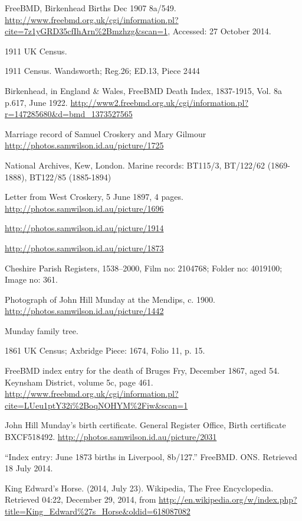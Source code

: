\begin{thebibliography}{99}
	FreeBMD, Birkenhead Births Dec 1907 8a/549.
	\url{http://www.freebmd.org.uk/cgi/information.pl?cite=7z1yGRD35cfIhArn\%2Bmzhzg&scan=1}, Accessed: 27 October 2014.

	1911 UK Census.

	1911 Census. Wandsworth; Reg.26; ED.13, Piece 2444

	Birkenhead, in England \& Wales, FreeBMD Death Index, 1837-1915, Vol. 8a p.617, June 1922.
	\url{http://www2.freebmd.org.uk/cgi/information.pl?r=147285680&d=bmd_1373527565}

	Marriage record of Samuel Croskery and Mary Gilmour
	\url{http://photos.samwilson.id.au/picture/1725}

	National Archives, Kew, London.
	Marine records: BT115/3, BT/122/62 (1869-1888), BT122/85 (1885-1894)

	Letter from West Croskery, 5 June 1897, 4 pages.
	\url{http://photos.samwilson.id.au/picture/1696}

	\url{http://photos.samwilson.id.au/picture/1914}

	\url{http://photos.samwilson.id.au/picture/1873}

	Cheshire Parish Registers, 1538--2000, Film no: 2104768; Folder no: 4019100; Image no: 361.

	Photograph of John Hill Munday at the Mendips, c. 1900.
	\url{http://photos.samwilson.id.au/picture/1442}

	Munday family tree.

	1861 UK Census; Axbridge Piece: 1674, Folio 11, p. 15.

	FreeBMD index entry for the death of Bruges Fry, December 1867, aged 54. 
	Keynsham District, volume 5c, page 461.
	\url{http://www.freebmd.org.uk/cgi/information.pl?cite=LUeu1ptY32i\%2BoqNOHYM\%2Fiw&scan=1}

	John Hill Munday's birth certificate. General Register Office, Birth certificate BXCF518492.
	\url{http://photos.samwilson.id.au/picture/2031}

	``Index entry: June 1873 births in Liverpool, 8b/127.'' FreeBMD. ONS. Retrieved 18 July 2014.

	King Edward's Horse. (2014, July 23). Wikipedia, The Free Encyclopedia. Retrieved 04:22, December 29, 2014,
	from \url{http://en.wikipedia.org/w/index.php?title=King_Edward\%27s_Horse&oldid=618087082}


\end{thebibliography}
